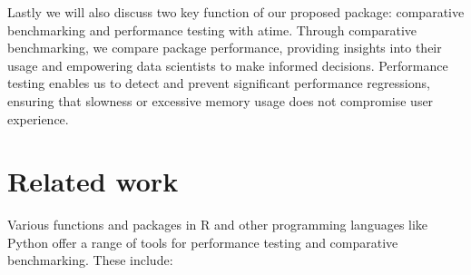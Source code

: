 \noindent Lastly we will also discuss two key function of our proposed package: comparative benchmarking and performance testing with atime. Through comparative benchmarking, we compare package performance, providing insights into their usage and empowering data scientists to make informed decisions. Performance testing enables us to detect and prevent significant performance regressions, ensuring that slowness or excessive memory usage does not compromise user experience.\\


\section{Related work}

\noindent Various functions and packages in R and other programming languages like Python offer a range of tools for performance testing and comparative benchmarking. These include: 
\\

